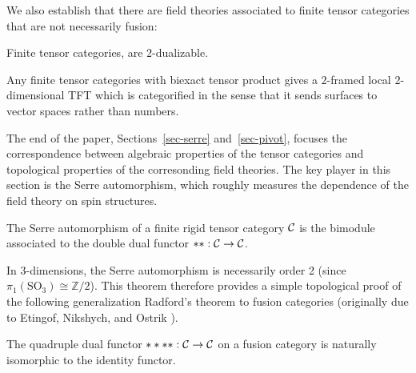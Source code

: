 \documentclass{amsart}
\begin{document}

We also establish that there are field theories associated to finite tensor categories that are not necessarily fusion:

\begin{theorem}
Finite tensor categories, are $2$-dualizable.
\end{theorem}

\begin{corollary}
Any finite tensor categories with biexact tensor product gives a $2$-framed local $2$-dimensional TFT which is categorified in the sense that it sends surfaces to vector spaces rather than numbers.
\end{corollary}

The end of the paper, Sections~\ref{sec-serre} and~\ref{sec-pivot}, focuses the correspondence between algebraic properties of the tensor categories and topological properties of the corresonding field theories.  The key player in this section is the Serre automorphism, which roughly measures the dependence of the field theory on spin structures.

\begin{theorem}
The Serre automorphism of a finite rigid tensor category $\mathcal C$ is the bimodule associated to the double dual functor $**: \mathcal C \rightarrow \mathcal C$.   
\end{theorem}

In $3$-dimensions, the Serre automorphism is necessarily order 2 (since $\pi_1(\mathrm{SO}_3) \cong \mathbb{Z}/2$). This theorem therefore provides a simple topological proof of the following generalization Radford's theorem \cite{MR0407069} to fusion categories (originally due to Etingof, Nikshych, and Ostrik \cite{MR2183279}).
\begin{corollary}
The quadruple dual functor $****: \mathcal C \rightarrow \mathcal C$ on a fusion category is naturally isomorphic to the identity functor.
\end{corollary}
\end{document}

